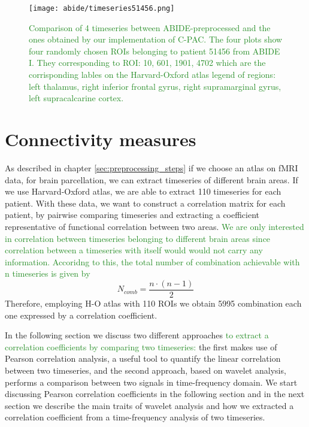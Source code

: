 \documentclass[11pt]{report}
\begin{document}
\begin{figure}[h]
\centering
\texttt{[image: abide/timeseries51456.png]}
\caption{\textcolor{ForestGreen}{Comparison of 4 timeseries between ABIDE-preprocessed and the ones obtained by our implementation of C-PAC. The four plots show four randomly chosen ROIs belonging to patient 51456 from ABIDE I. They corresponding to ROI: 10, 601, 1901, 4702 which are the corrisponding lables on the Harvard-Oxford atlas legend of regions: left thalamus, right inferior frontal gyrus, right supramarginal gyrus, left supracalcarine cortex.}}
\label{fig:confrontoabidepreproc}
\end{figure}



\chapter{Connectivity measures}\label{chap:connectivity_coefficients}
As described in chapter \ref{sec:preprocessing_steps} if we choose an atlas on fMRI data, for brain parcellation, we can extract timeseries of different brain areas. If we use Harvard-Oxford atlas, we are able to extract 110 timeseries for each patient.
With these data, we want to construct a correlation matrix for each patient, by pairwise comparing timeseries and extracting a coefficient representative of functional correlation between two areas.
\textcolor{ForestGreen}{We are only interested in correlation between timeseries belonging to different brain areas since correlation between a timeseries with itself would would not carry any information.
Accoridng to this, the total number of combination achievable with n timeseries is given by
}
\begin{equation}
N_{comb} = \frac{n\cdot(n-1)}{2}
\end{equation}
Therefore, employing H-O atlas with 110 ROIs we obtain 5995 combination each one expressed by a correlation coefficient.

In the following section we discuss two different approaches \textcolor{ForestGreen}{to extract a correlation coefficients by comparing two timeseries:} the first makes use of Pearson correlation analysis, a useful tool to quantify the linear correlation between two timeseries, and the second approach, based on wavelet analysis, performs a comparison between two signals in time-frequency domain.
We start discussing Pearson correlation coefficients in the following section and in the next section we describe the main traits of wavelet analysis and how we extracted a correlation coefficient from a time-frequency analysis of two timeseries.
\end{document}
